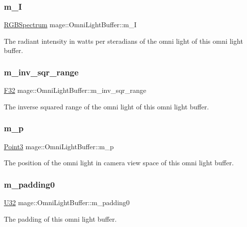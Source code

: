 \subsubsection{\texorpdfstring{m\+\_\+I}{m\_I}}
{\footnotesize\ttfamily \hyperlink{structmage_1_1_r_g_b_spectrum}{R\+G\+B\+Spectrum} mage\+::\+Omni\+Light\+Buffer\+::m\+\_\+I}

The radiant intensity in watts per steradians of the omni light of this omni light buffer. \hypertarget{structmage_1_1_omni_light_buffer_a156d844a76bb2a98859263128740a95b}{}\label{structmage_1_1_omni_light_buffer_a156d844a76bb2a98859263128740a95b} 
\subsubsection{\texorpdfstring{m\+\_\+inv\+\_\+sqr\+\_\+range}{m\_inv\_sqr\_range}}
{\footnotesize\ttfamily \hyperlink{namespacemage_aa97e833b45f06d60a0a9c4fc22ae02c0}{F32} mage\+::\+Omni\+Light\+Buffer\+::m\+\_\+inv\+\_\+sqr\+\_\+range}

The inverse squared range of the omni light of this omni light buffer. \hypertarget{structmage_1_1_omni_light_buffer_a777b98a686a7e39bd7b401748629d9fc}{}\label{structmage_1_1_omni_light_buffer_a777b98a686a7e39bd7b401748629d9fc} 
\subsubsection{\texorpdfstring{m\+\_\+p}{m\_p}}
{\footnotesize\ttfamily \hyperlink{structmage_1_1_point3}{Point3} mage\+::\+Omni\+Light\+Buffer\+::m\+\_\+p}

The position of the omni light in camera view space of this omni light buffer. \hypertarget{structmage_1_1_omni_light_buffer_af75a020722cd8eb37b91fe42a5b0ad5c}{}\label{structmage_1_1_omni_light_buffer_af75a020722cd8eb37b91fe42a5b0ad5c} 
\subsubsection{\texorpdfstring{m\+\_\+padding0}{m\_padding0}}
{\footnotesize\ttfamily \hyperlink{namespacemage_a41c104c036fba3756a74e19f793eeaa1}{U32} mage\+::\+Omni\+Light\+Buffer\+::m\+\_\+padding0}

The padding of this omni light buffer. 